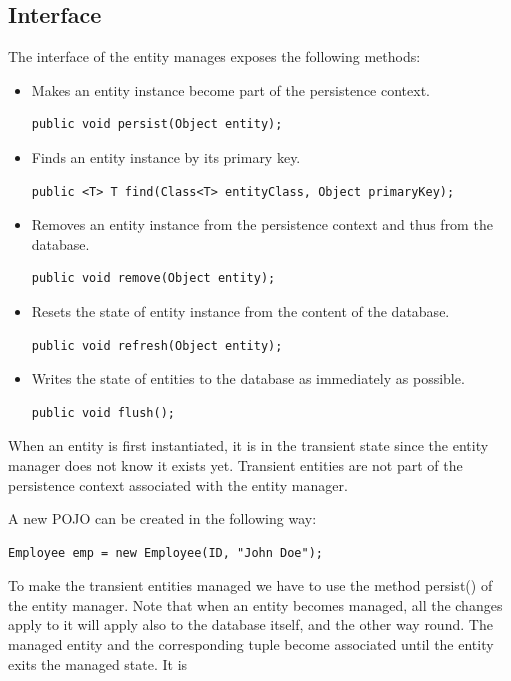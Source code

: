 \subsection*{Interface}
The interface of the entity manages exposes the following methods: 
\begin{itemize}
    \item Makes an entity instance become part of the persistence context. 
        \begin{lstlisting}[style=Java]
public void persist(Object entity); 
        \end{lstlisting}
    \item Finds an entity instance by its primary key. 
        \begin{lstlisting}[style=Java]
public <T> T find(Class<T> entityClass, Object primaryKey);
        \end{lstlisting}
    \item Removes an entity instance from the persistence context and thus from the database.
        \begin{lstlisting}[style=Java]
public void remove(Object entity); 
        \end{lstlisting}
    \item Resets the state of entity instance from the content of the database.
        \begin{lstlisting}[style=Java]
public void refresh(Object entity); 
        \end{lstlisting}
    \item Writes the state of entities to the database as immediately as possible.
        \begin{lstlisting}[style=Java]
public void flush();
        \end{lstlisting}
\end{itemize}
When an entity is first instantiated, it is in the transient state since the entity manager does not know it exists yet. Transient entities are not part of the 
persistence context associated with the entity manager. 
\begin{example}
    A new POJO can be created in the following way: 
    \begin{lstlisting}[style=Java]
Employee emp = new Employee(ID, "John Doe"); 
    \end{lstlisting}
\end{example}
To make the transient entities managed we have to use the method persist() of the entity manager. Note that when an entity becomes managed, all the changes apply to it 
will apply also to the database itself, and the other way round. The managed entity and the corresponding tuple become associated until the entity exits the managed state. It is 
